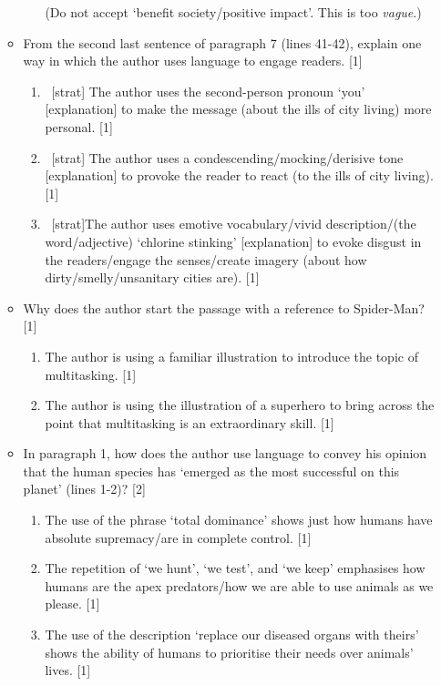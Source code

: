 \documentclass[oneside]{book}
\begin{document}
\begin{itemize}
\begin{itemize}
\begin{enumerate}[label=(\alph*)]
            (Do not accept `benefit society/positive impact'. This is too \emph{vague}.)
        \end{enumerate}
        \item From the second last sentence of paragraph 7 (lines 41-42), explain one way in which the author uses language to engage readers. [1]
        \begin{enumerate}[label=(\alph*)]
            \item\ [strat] The author uses the second-person pronoun `you' [explanation] to make the message (about the ills of city living) more personal. [1]
            \item\ [strat] The author uses a condescending/mocking/derisive tone [explanation] to provoke the reader to react (to the ills of city living). [1]
            \item\ [strat]The author uses emotive vocabulary/vivid description/(the word/adjective) `chlorine stinking' [explanation] to evoke disgust in the readers/engage the senses/create imagery (about how dirty/smelly/unsanitary cities are). [1]
        \end{enumerate}
        \item Why does the author start the passage with a reference to Spider-Man? [1]
        \begin{enumerate}[label=(\alph*)]
            \item The author is using a familiar illustration to introduce the topic of multitasking. [1]
            \item The author is using the illustration of a superhero to bring across the point that multitasking is an extraordinary skill. [1]
        \end{enumerate}
        \item In paragraph 1, how does the author use language to convey his opinion that the human species has `emerged as the most successful on this planet' (lines 1-2)? [2]
        \begin{enumerate}[label=(\alph*)]
            \item The use of the phrase `total dominance' shows just how humans have absolute supremacy/are in complete control. [1]
            \item The repetition of `we hunt', `we test', and `we keep' emphasises how humans are the apex predators/how we are able to use animals as we please. [1]
            \item The use of the description `replace our diseased organs with theirs' shows the ability of humans to prioritise their needs over animals' lives. [1]

\end{enumerate}
\end{itemize}
\end{itemize}
\end{document}
